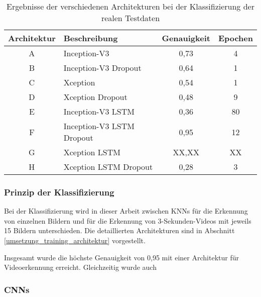 \begin{table}[h]
\small
\centering
\def\arraystretch{1.4}
\begin{tabular}{c p{3cm} c c}
\textbf{Architektur} & \textbf{Beschreibung} & \textbf{Genauigkeit} & \textbf{Epochen} \\
\hline
A & Inception-V3 & 0,73 & 4 \\
\hline
B & Inception-V3 \newline Dropout & 0,64 & 1 \\
\hline
C & Xception & 0,54 & 1 \\
\hline
D & Xception \newline Dropout & 0,48 & 9 \\
\hline 
E & Inception-V3 \newline LSTM & 0,36 & 80 \\
\hline
F & Inception-V3 \newline LSTM \newline Dropout & 0,95 & 12 \\
\hline
G & Xception \newline LSTM & XX,XX & XX \\
\hline
H & Xception \newline LSTM \newline Dropout & 0,28 & 3 \\
\hline
\end{tabular}
\caption{Ergebnisse der verschiedenen Architekturen bei der Klassifizierung der realen Testdaten}
\label{tab_ergebnis}
\end{table}

\subsubsection{Prinzip der Klassifizierung}

Bei der Klassifizierung wird in dieser Arbeit zwischen \acp{KNN} für die Erkennung von einzelnen Bildern und für die Erkennung von 3-Sekunden-Videos mit jeweils 15 Bildern unterschieden. Die detaillierten Architekturen sind in Abschnitt \ref{umsetzung_training_architektur} vorgestellt.

Insgesamt wurde die höchste Genauigkeit von 0,95 mit einer Architektur für Videoerkennung erreicht. Gleichzeitig wurde auch 



\subsubsection{\aclp{CNN}}


